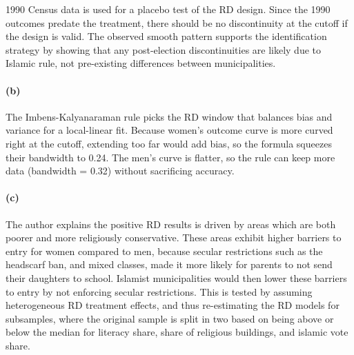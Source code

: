 \documentclass{scrartcl}
\begin{document}
 1990 Census data is used for a placebo test of the RD design. Since the 1990 outcomes predate the treatment, there should be no discontinuity at the cutoff if the design is valid. The observed smooth pattern supports the identification strategy by showing that any post-election discontinuities are likely due to Islamic rule, not pre-existing differences between municipalities.




\paragraph*{(b)}

The Imbens-Kalyanaraman rule picks the RD window that balances bias and variance for a local-linear fit. Because women’s outcome curve is more curved right at the cutoff, extending too far would add bias, so the formula squeezes their bandwidth to 0.24. The men’s curve is flatter, so the rule can keep more data (bandwidth = 0.32) without sacrificing accuracy.

\paragraph*{(c)}

The author explains the positive RD results is driven by areas which are both poorer and more religiously conservative. These areas exhibit higher barriers to entry for women compared to men, because secular restrictions such as the headscarf ban, and mixed classes, made it more likely for parents to not send their daughters to school. Islamist municipalities would then lower these barriers to entry by not enforcing secular restrictions. This is tested by assuming heterogeneous RD treatment effects, and thus re-estimating the RD models for subsamples, where the original sample is split in two based on being above or below the median for literacy share, share of religious buildings, and islamic vote share.
\end{document}
